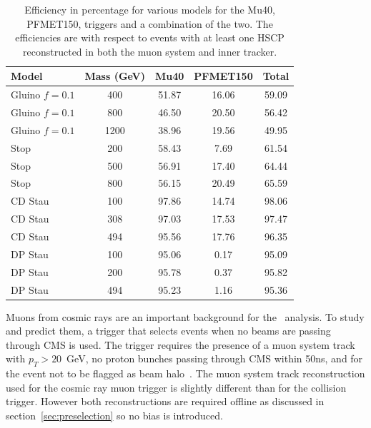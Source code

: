 \begin{table}
 \begin{center}
      \caption[Trigger efficiency for various models considered with respect to events with a reconstructed HSCP in both the muon system and inner tracker]
	      {Efficiency in percentage for various models for the Mu40, PFMET150, triggers and a combination of the two.
The efficiencies are with respect to events with at least one HSCP reconstructed in both the muon system and inner tracker.}
     \label{tab:triggEffGl}
  \begin{tabular}{|l|c|c|c|c|} \hline
      Model     & Mass (GeV) & Mu40       & PFMET150   & Total                 \\ \hline
 Gluino $f=0.1$ &  400       & 51.87      & 16.06      & 59.09    \\
 Gluino $f=0.1$ &  800       & 46.50      & 20.50      & 56.42    \\
 Gluino $f=0.1$ & 1200       & 38.96      & 19.56      & 49.95    \\
           Stop &  200       & 58.43      &  7.69      & 61.54    \\
           Stop &  500       & 56.91      & 17.40      & 64.44    \\
           Stop &  800       & 56.15      & 20.49      & 65.59    \\
        CD Stau &  100       & 97.86      & 14.74      & 98.06    \\
        CD Stau &  308       & 97.03      & 17.53      & 97.47    \\
        CD Stau &  494       & 95.56      & 17.76      & 96.35    \\
        DP Stau &  100       & 95.06      &  0.17      & 95.09    \\
        DP Stau &  200       & 95.78      &  0.37      & 95.82    \\
        DP Stau &  494       & 95.23      &  1.16      & 95.36    \\ \hline
  \end{tabular}
 \end{center}
\end{table}

Muons from cosmic rays are an important background for the \muononly\ analysis. To study and predict them, a trigger that selects events when no beams are passing through
CMS is used. The trigger requires the presence of a muon system track with $p_T > 20$~GeV, no proton bunches passing through CMS within 50ns,
and for the event not to be flagged as beam halo~\cite{wangler2000beam}.
The muon system track reconstruction used for the cosmic ray muon trigger is slightly different than for the collision trigger.
However both reconstructions are required offline as discussed in section~\ref{sec:preselection} so no bias is introduced.


